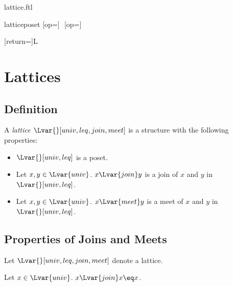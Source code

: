 \documentclass{stex}
\begin{document}
\begin{smodule}{lattice.ftl}

\begin{extstructure}{lattice}{poset}
  [op=\vee]{\,\vee\,}
  [op=\wedge]{\,\wedge\,}
\end{extstructure}

[return={\lattice[comp=##1]}]{\mathcal L}

\section{Lattices}

\begin{forthel}
\end{forthel}

\subsection{Definition}

\begin{signature*}[forthel,id=LatticeSig,printid]
  A \emph{lattice $\Lvar{}[univ,leq,join,meet]$} is a structure with the following properties:
  
  \begin{itemize}
    \item\label{latticeSig}
      $\Lvar{}[univ,leq]$ is a poset.
    \item\label{latticeJoinSig}
      Let $x,y\in\Lvar{univ}$.
      $x{\Lvar{join}}y$ is a join of $x$ and $y$ in $\Lvar{}[univ,leq]$.
    \item\label{latticeMeetSig}
      Let $x,y\in\Lvar{univ}$.
      $x{\Lvar{meet}}y$ is a meet of $x$ and $y$ in $\Lvar{}[univ,leq]$.
  \end{itemize}
\end{signature*}

\subsection{Properties of Joins and Meets}

\begin{forthel}
  Let $\Lvar{}[univ,leq,join,meet]$ denote a lattice.
\end{forthel}

\begin{proposition*}[forthel,id=JoinIdempotenceThm,printid]
  Let $x\in\Lvar{univ}$.
  $x{\Lvar{join}}x\eq x$.
\end{proposition*}


\end{smodule}
\end{document}
